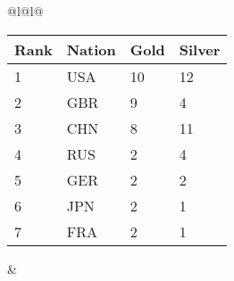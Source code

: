 \small
\begin{tabular}{@{}l@{\hspace*{.3cm}}l@{}}
\begin{tabular}{@{}|@{\ww}l@{\ww}l@{\ww}l@{\ww}l@{\ww}|@{}}
\hline
Rank & Nation & Gold & Silver \\%
\hline
1 & USA	&	10 &	12 \\%
2 & GBR	&	9 &	4 \\%
3 & CHN	&	8 &	11 \\%
4 & RUS &	2 &	4 \\%
5 & GER &	2 &	2 \\%
6 & JPN & 	2 &	1 \\%
7 & FRA &	2 &	1 \\%
\hline
\end{tabular}%
&
\\
\end{tabular}
